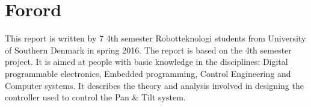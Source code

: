 \section{Forord}

This report is written by 7 4th semester Robotteknologi students from University of Southern Denmark in spring 2016. The report is based on the 4th semester project.
It is aimed at people with basic knowledge in the disciplines: Digital programmable electronics, Embedded programming, Control Engineering and Computer systems.
It describes the theory and analysis involved in designing the controller used to control the Pan \& Tilt system.